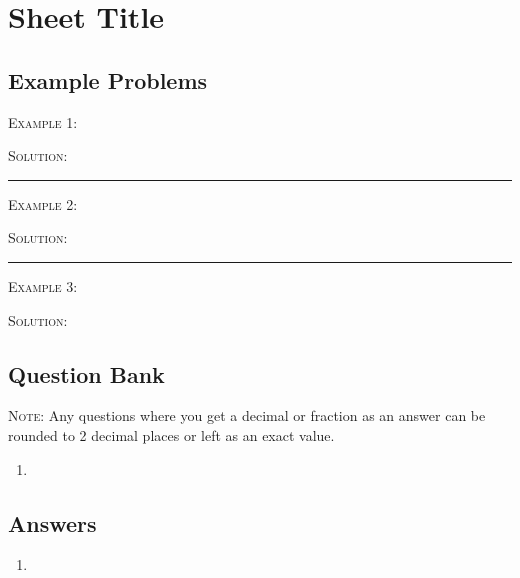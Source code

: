\documentclass[a4paper,12pt]{article}
\begin{document}
\section*{Sheet Title}

\subsection*{Example Problems}

\textsc{Example 1}: 

\textsc{Solution}: 

\vspace{3mm}
\hrule
\vspace{3mm}

\textsc{Example 2}: 

\textsc{Solution}: 

\vspace{3mm}
\hrule
\vspace{3mm}

\textsc{Example 3}: 

\textsc{Solution}: 

\newpage
\subsection*{Question Bank}

\textsc{Note}: Any questions where you get a decimal or fraction 
as an answer can be rounded to 2 decimal places or left as 
an exact value.

\begin{enumerate}
\item 
\end{enumerate}

\newpage
\subsection*{Answers}

\begin{enumerate}
\item 
\end{enumerate}
\end{document}
